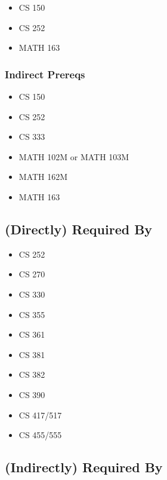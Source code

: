 \documentclass[]{article}
\providecommand{\tightlist}{%
  \setlength{\itemsep}{0pt}\setlength{\parskip}{0pt}}
\begin{document}
\begin{itemize}
\tightlist
\item
  CS 150
\item
  CS 252
\item
  MATH 163
\end{itemize}

\subsubsection{Indirect Prereqs}\label{indirect-prereqs-10}

\begin{multicols}{2}
\begin{itemize}
\tightlist
\item
  CS 150
\item
  CS 252
\item
  CS 333
\item
  MATH 102M or MATH 103M
\item
  MATH 162M
\item
  MATH 163
\end{itemize}
\end{multicols}

\subsection{(Directly) Required By}\label{directly-required-by-8}

\begin{multicols}{2}
\begin{itemize}
\tightlist
\item
  CS 252
\item
  CS 270
\item
  CS 330
\item
  CS 355
\item
  CS 361
\item
  CS 381
\item
  CS 382
\item
  CS 390
\item
  CS 417/517
\item
  CS 455/555
\end{itemize}
\end{multicols}

\subsection{(Indirectly) Required By}\label{indirectly-required-by-8}
\end{document}
